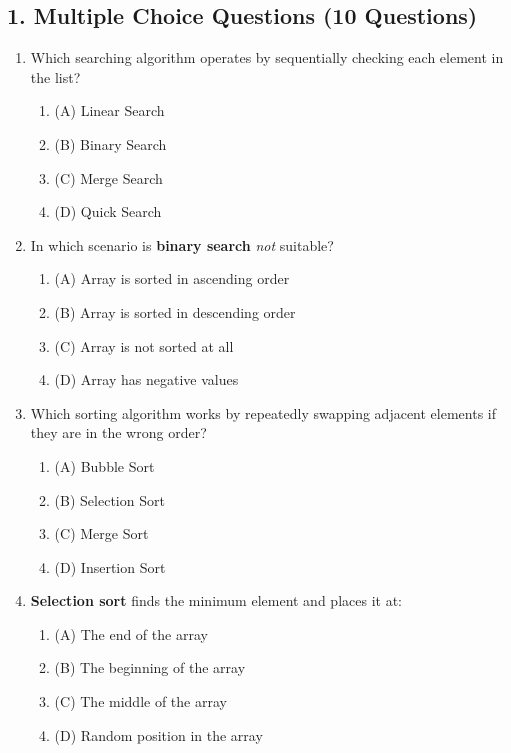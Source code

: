 \documentclass[a4paper,12pt]{article}
\begin{document}
\subsection{1. Multiple Choice Questions (10 Questions)}
\begin{enumerate}
    \item Which searching algorithm operates by sequentially checking each element in the list?
    \begin{enumerate}
        \item (A) Linear Search
        \item (B) Binary Search
        \item (C) Merge Search
        \item (D) Quick Search
    \end{enumerate}

    \item In which scenario is \textbf{binary search} \textit{not} suitable?
    \begin{enumerate}
        \item (A) Array is sorted in ascending order
        \item (B) Array is sorted in descending order
        \item (C) Array is not sorted at all
        \item (D) Array has negative values
    \end{enumerate}

    \item Which sorting algorithm works by repeatedly swapping adjacent elements if they are in the wrong order?
    \begin{enumerate}
        \item (A) Bubble Sort
        \item (B) Selection Sort
        \item (C) Merge Sort
        \item (D) Insertion Sort
    \end{enumerate}

    \item \textbf{Selection sort} finds the minimum element and places it at:
    \begin{enumerate}
        \item (A) The end of the array
        \item (B) The beginning of the array
        \item (C) The middle of the array
        \item (D) Random position in the array
    \end{enumerate}


\end{enumerate}
\end{document}

